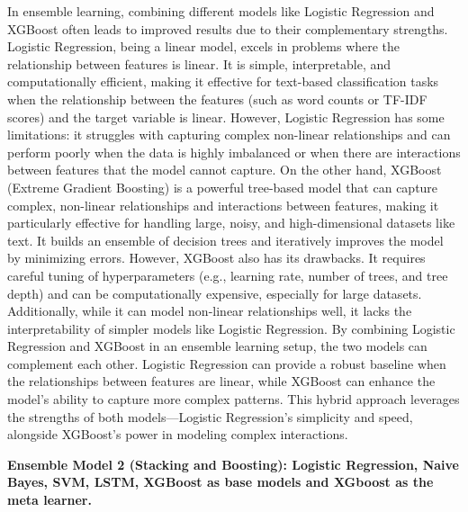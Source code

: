 \noindent
In ensemble learning, combining different models like Logistic Regression and XGBoost often leads to improved results due to their complementary strengths. Logistic Regression, being a linear model, excels in problems where the relationship between features is linear. It is simple, interpretable, and computationally efficient, making it effective for text-based classification tasks when the relationship between the features (such as word counts or TF-IDF scores) and the target variable is linear. However, Logistic Regression has some limitations: it struggles with capturing complex non-linear relationships and can perform poorly when the data is highly imbalanced or when there are interactions between features that the model cannot capture. On the other hand, XGBoost (Extreme Gradient Boosting) is a powerful tree-based model that can capture complex, non-linear relationships and interactions between features, making it particularly effective for handling large, noisy, and high-dimensional datasets like text. It builds an ensemble of decision trees and iteratively improves the model by minimizing errors. However, XGBoost also has its drawbacks. It requires careful tuning of hyperparameters (e.g., learning rate, number of trees, and tree depth) and can be computationally expensive, especially for large datasets. Additionally, while it can model non-linear relationships well, it lacks the interpretability of simpler models like Logistic Regression. By combining Logistic Regression and XGBoost in an ensemble learning setup, the two models can complement each other. Logistic Regression can provide a robust baseline when the relationships between features are linear, while XGBoost can enhance the model's ability to capture more complex patterns. This hybrid approach leverages the strengths of both models—Logistic Regression's simplicity and speed, alongside XGBoost's power in modeling complex interactions.

\pagebreak

\noindent
\textbf{Ensemble Model 2 (Stacking and Boosting): Logistic Regression, Naive Bayes, SVM, LSTM, XGBoost as base models and XGboost as the meta learner. }
 

